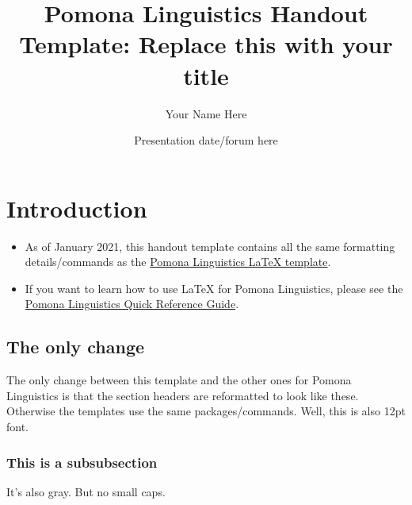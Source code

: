 \documentclass[12pt]{article}
\title{Pomona Linguistics Handout Template: Replace this with your title}
\author{Your Name Here}
\date{Presentation date/forum here}
\begin{document}
\maketitle

\section{Introduction}

\begin{itemize}

\item As of January 2021, this handout template contains all the same formatting details/commands as the \href{https://www.overleaf.com/latex/templates/pomona-linguistics-latex-template/bvdxdtpwysnd}{Pomona Linguistics LaTeX template}.

\item If you want to learn how to use LaTeX for Pomona Linguistics, please see the \href{https://www.overleaf.com/latex/templates/pomona-linguistics-quick-reference-guide/jthrqbrktmrd}{Pomona Linguistics Quick Reference Guide}.

\end{itemize}

\subsection{The only change}

The only change between this template and the other ones for Pomona Linguistics is that the section headers are reformatted to look like these. Otherwise the templates use the same packages/commands. Well, this is also 12pt font.

\subsubsection{This is a subsubsection}

It's also gray. But no small caps.
\end{document}

